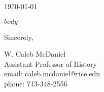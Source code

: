 \documentclass[12pt]{article}
\begin{document}
\thispagestyle{empty}
\vspace*{0.5in}

\today
\begin{flushleft}
$body$
\end{flushleft}

Sincerely,
\par%
W. Caleb McDaniel\\Assistant Professor of History\\email: caleb.mcdaniel@rice.edu\\phone: 713-348-2556
\end{document}
